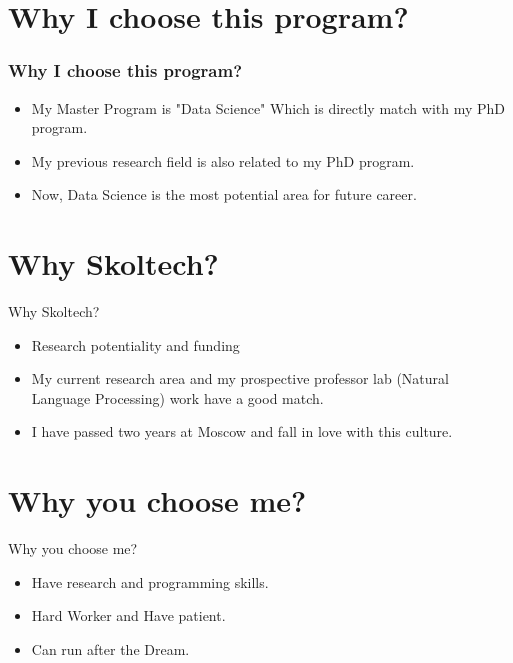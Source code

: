 \documentclass[smaller,aspectratio=169]{beamer}
\begin{document}
	\section{Why I choose this program?}
	\begin{frame} 
		\frametitle{Why I choose this program?}
		\begin{itemize}
			\item My Master Program is "Data Science" Which is directly match with my PhD program.
			\item My previous research field is also related to my PhD program.
			\item Now, Data Science is the most potential area for future career.
		\end{itemize}
	\end{frame}
	
	\section{Why Skoltech?}
	\begin{frame}{Why Skoltech?}
	\begin{itemize}
	    \item Research potentiality and funding
	    \item My current research area and my prospective professor lab (Natural Language Processing) work have a good match.
	    \item I have passed two years at Moscow and fall in love with this culture.
	\end{itemize}
	    
	\end{frame}
	
	\section{Why you choose me?}
	\begin{frame}{Why you choose me?}
	\begin{itemize}
	    \item Have research and programming skills.
	    \item Hard Worker and Have patient.
	    \item Can run after the Dream.
	\end{itemize}
	    
	\end{frame}
	
\end{document}
